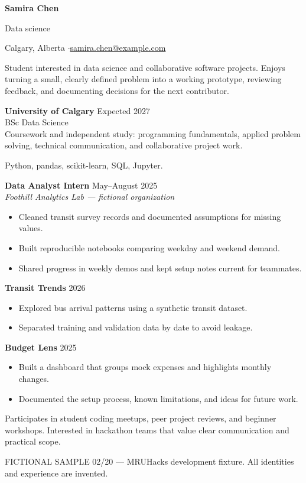 
{\Huge\bfseries Samira Chen}\par
{\large\color{accent} Data science}\par
Calgary, Alberta \enspace$\cdot$\enspace \href{mailto:samira.chen@example.com}{samira.chen@example.com}

Student interested in data science and collaborative software projects.
Enjoys turning a small, clearly defined problem into a working prototype,
reviewing feedback, and documenting decisions for the next contributor.

\textbf{University of Calgary} \hfill Expected 2027\\
BSc Data Science\\
Coursework and independent study: programming fundamentals, applied problem solving,
technical communication, and collaborative project work.

Python, pandas, scikit-learn, SQL, Jupyter.

\textbf{Data Analyst Intern} \hfill May--August 2025\\
\textit{Foothill Analytics Lab --- fictional organization}
\begin{itemize}
\item Cleaned transit survey records and documented assumptions for missing values.
\item Built reproducible notebooks comparing weekday and weekend demand.
\item Shared progress in weekly demos and kept setup notes current for teammates.
\end{itemize}

\textbf{Transit Trends} \hfill 2026
\begin{itemize}
\item Explored bus arrival patterns using a synthetic transit dataset.
\item Separated training and validation data by date to avoid leakage.
\end{itemize}
\textbf{Budget Lens} \hfill 2025
\begin{itemize}
\item Built a dashboard that groups mock expenses and highlights monthly changes.
\item Documented the setup process, known limitations, and ideas for future work.
\end{itemize}

Participates in student coding meetups, peer project reviews, and beginner workshops.
Interested in hackathon teams that value clear communication and practical scope.

\vfill
{\footnotesize\color{gray} FICTIONAL SAMPLE 02/20 --- MRUHacks development fixture.
All identities and experience are invented.}

